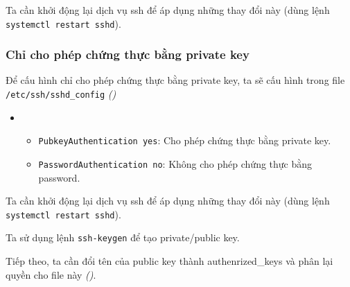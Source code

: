 Ta cần khởi động lại dịch vụ ssh để áp dụng những thay đổi này (dùng lệnh \texttt{systemctl restart sshd}).

\subsubsection{Chỉ cho phép chứng thực bằng private key}

Để cấu hình chỉ cho phép chứng thực bằng private key, ta sẽ cấu hình trong file \texttt{/etc/ssh/sshd\_config} \textit{()}


\begin{itemize}[label={}]
  \item
        \begin{itemize}[label={--}]
          \item \texttt{PubkeyAuthentication yes}: Cho phép chứng thực bằng private key.
          \item \texttt{PasswordAuthentication no}: Không cho phép chứng thực bằng password.
        \end{itemize}
\end{itemize}

Ta cần khởi động lại dịch vụ ssh để áp dụng những thay đổi này (dùng lệnh \texttt{systemctl restart sshd}).

Ta sử dụng lệnh \texttt{ssh-keygen} để tạo private/public key.


Tiếp theo, ta cần đổi tên của public key thành authenrized\_keys và phân lại quyền
cho file này \textit{()}.




